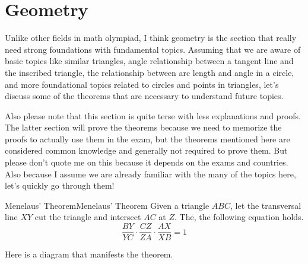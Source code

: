\documentclass[../../../main.tex]{subfiles}
\begin{document}
\section{Geometry}

Unlike other fields in math olympiad, I think geometry is the section
that really need strong foundations with fundamental topics.
Assuming that we are aware of basic topics like similar triangles,
angle relationship between a tangent line and the inscribed triangle,
the relationship between arc length and angle in a circle, and more
foundational topics related to circles and points in triangles,
let's discuss some of the theorems that are necessary to understand
future topics.

Also please note that this section is quite terse with less
explanations and proofs. The latter section will prove the theorems
because we need to memorize the proofs to actually use them in the
exam, but the theorems mentioned here are considered common knowledge
and generally not required to prove them. But please don't quote me on
this because it depends on the exams and countries. Also because I
assume we are already familiar with the many of the topics here,
let's quickly go through them!

\begin{theorem}{Menelaus' Theorem}{Menelaus' Theorem}
Given a triangle $ABC$, let the transversal line $XY$ cut the triangle
and intersect $AC$ at $Z$. The, the following equation holds.
\[
\frac{BY}{YC} \cdot \frac{CZ}{ZA} \cdot \frac{AX}{XB} = 1
\]
\end{theorem}

Here is a diagram that manifests the theorem.

\begin{figure}[H]
\centering
{}
\end{figure}
\end{document}

